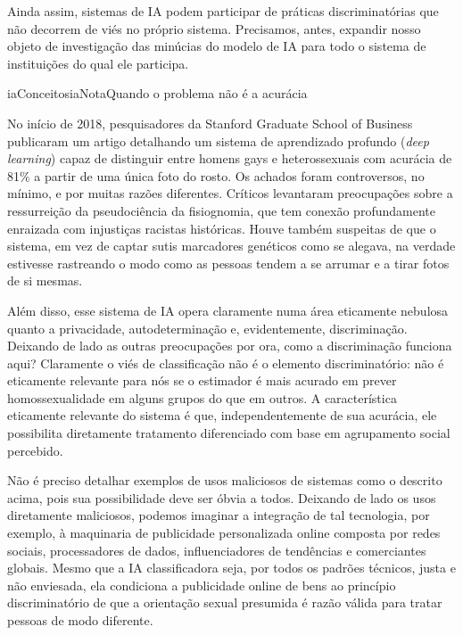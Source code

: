 \documentclass[
  11pt,
]{article}
\newenvironment{nota}[1][Nota]{\begin{iabox}{iaConceitos}{iaNota}{#1}}{\end{iabox}}
\begin{document}
Ainda assim, sistemas de IA podem participar de práticas
discriminatórias que não decorrem de viés no próprio sistema.
Precisamos, antes, expandir nosso objeto de investigação das minúcias do
modelo de IA para todo o sistema de instituições do qual ele participa.

\begin{nota}[Quando o problema não é a acurácia]

No início de 2018, pesquisadores da Stanford Graduate School of Business
publicaram um artigo detalhando um sistema de aprendizado profundo
(\emph{deep learning}) capaz de distinguir entre homens gays e
heterossexuais com acurácia de 81\% a partir de uma única foto do rosto.
Os achados foram controversos, no mínimo, e por muitas razões
diferentes. Críticos levantaram preocupações sobre a ressurreição da
pseudociência da fisiognomia, que tem conexão profundamente enraizada
com injustiças racistas históricas. Houve também suspeitas de que o
sistema, em vez de captar sutis marcadores genéticos como se alegava, na
verdade estivesse rastreando o modo como as pessoas tendem a se arrumar
e a tirar fotos de si mesmas.

Além disso, esse sistema de IA opera claramente numa área eticamente
nebulosa quanto a privacidade, autodeterminação e, evidentemente,
discriminação. Deixando de lado as outras preocupações por ora, como a
discriminação funciona aqui? Claramente o viés de classificação não é o
elemento discriminatório: não é eticamente relevante para nós se o
estimador é mais acurado em prever homossexualidade em alguns grupos do
que em outros. A característica eticamente relevante do sistema é que,
independentemente de sua acurácia, ele possibilita diretamente
tratamento diferenciado com base em agrupamento social percebido.

\end{nota}

Não é preciso detalhar exemplos de usos maliciosos de sistemas como o
descrito acima, pois sua possibilidade deve ser óbvia a todos. Deixando
de lado os usos diretamente maliciosos, podemos imaginar a integração de
tal tecnologia, por exemplo, à maquinaria de publicidade personalizada
online composta por redes sociais, processadores de dados,
influenciadores de tendências e comerciantes globais. Mesmo que a IA
classificadora seja, por todos os padrões técnicos, justa e não
enviesada, ela condiciona a publicidade online de bens ao princípio
discriminatório de que a orientação sexual presumida é razão válida para
tratar pessoas de modo diferente.
\end{document}
